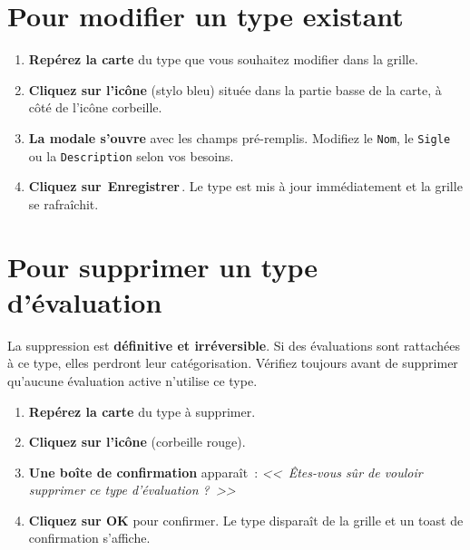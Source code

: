 \documentclass[12pt,a4paper]{report}
\newcommand{\champ}[1]{\texttt{\color{violet}#1}}
\newcommand{\bouton}[1]{{\colorbox{emerald}{\small\sffamily\bfseries\color{white}\,#1\,}}}
\begin{document}
\section{Pour modifier un type existant}

\begin{etape}[title=Procédure détaillée : Modifier un type d'évaluation]
\begin{enumerate}[leftmargin=1.5cm,label=\textbf{\arabic*.},itemsep=10pt]
  \item \textbf{Repérez la carte} du type que vous souhaitez modifier dans la grille.

  \item \textbf{Cliquez sur l'icône} \textcolor{indigo}{\faPen} (stylo bleu) située dans la partie basse de la carte, à côté de l'icône corbeille.

  \item \textbf{La modale s'ouvre} avec les champs pré-remplis. Modifiez le \champ{Nom}, le \champ{Sigle} ou la \champ{Description} selon vos besoins.

  \item \textbf{Cliquez sur} \bouton{Enregistrer}. Le type est mis à jour immédiatement et la grille se rafraîchit.
\end{enumerate}
\end{etape}

\section{Pour supprimer un type d'évaluation}

\begin{danger}
La suppression est \textbf{définitive et irréversible}. Si des évaluations sont rattachées à ce type, elles perdront leur catégorisation. Vérifiez toujours avant de supprimer qu'aucune évaluation active n'utilise ce type.
\end{danger}

\begin{etape}[title=Procédure détaillée : Supprimer un type]
\begin{enumerate}[leftmargin=1.5cm,label=\textbf{\arabic*.},itemsep=10pt]
  \item \textbf{Repérez la carte} du type à supprimer.
  \item \textbf{Cliquez sur l'icône} \textcolor{rose}{\faTrash} (corbeille rouge).
  \item \textbf{Une boîte de confirmation} apparaît~: \textit{<<~Êtes-vous sûr de vouloir supprimer ce type d'évaluation ?~>>}
  \item \textbf{Cliquez sur OK} pour confirmer. Le type disparaît de la grille et un toast de confirmation s'affiche.
\end{enumerate}
\end{etape}
\end{document}
